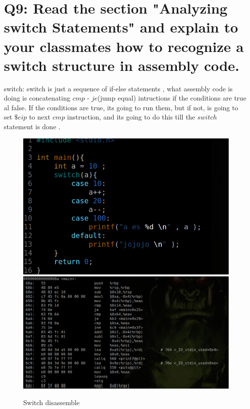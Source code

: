 \documentclass[10pt,a4paper]{article} %
\begin{document}
    \newpage
    \section{Q9: Read the section "Analyzing switch Statements" and explain to
        your classmates how to recognize a switch structure in assembly code.}

        switch:
        switch is just a sequence of if-else statements , what assembly code is
        doing is concatenating  $ cmp  $ -  $ je  $(jump equal) intructions if
        the conditions are true al false. If the conditions are true, its going
        to run them, but if not, is going to set $ \$eip  $  to next $ cmp  $
        instruction, and its going to do this till the $ switch  $ statement is
        done .
        \begin{figure}[h!]
            \centering
            \includegraphics[width=0.8\linewidth]{switchcode.png}
            \includegraphics[width=0.8\linewidth]{switchdis.png}
            \caption{Switch disassemble}
            \label{switch}
        \end{figure}










    \nocite{*}
    
    
\end{document}
